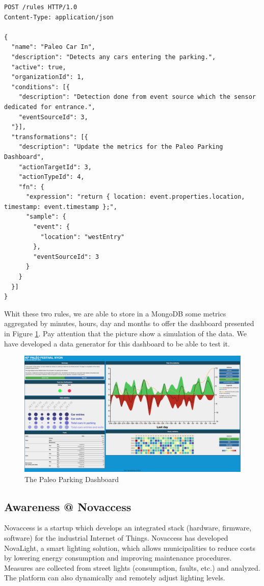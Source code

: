 \begin{lstlisting}
POST /rules HTTP/1.0
Content-Type: application/json

{
  "name": "Paleo Car In",
  "description": "Detects any cars entering the parking.",
  "active": true,
  "organizationId": 1,
  "conditions": [{
    "description": "Detection done from event source which the sensor dedicated for entrance.",
    "eventSourceId": 3,
  "}],
  "transformations": [{
    "description": "Update the metrics for the Paleo Parking Dashboard",
    "actionTargetId": 3,
    "actionTypeId": 4,
    "fn": {
      "expression": "return { location: event.properties.location, timestamp: event.timestamp };",
      "sample": {
        "event": {
          "location": "westEntry"
        },
        "eventSourceId": 3
      }
    }
  }]
}
\end{lstlisting}

Whit these two rules, we are able to store in a MongoDB some metrics aggregated by minutes, hours, day and months to offer the dashboard presented in Figure \ref{fig:paleoDashboard}. Pay attention that the picture show a simulation of the data. We have developed a data generator for this dashboard to be able to test it.

\begin{figure}
\centering
\includegraphics[width=1\columnwidth]{figures/paleoDashboard.png}
\caption{The Paleo Parking Dashboard}
\label{fig:paleoDashboard}
\end{figure}


\subsection{Awareness @ Novaccess}

Novaccess is a startup which develops an integrated stack (hardware, firmware, software) for the industrial Internet of Things. Novaccess has developed NovaLight, a smart lighting solution, which allows municipalities to reduce costs by lowering energy consumption and improving maintenance procedures. Measures are collected from street lights (consumption, faults, etc.) and analyzed. The platform can also dynamically and remotely adjust lighting levels.

